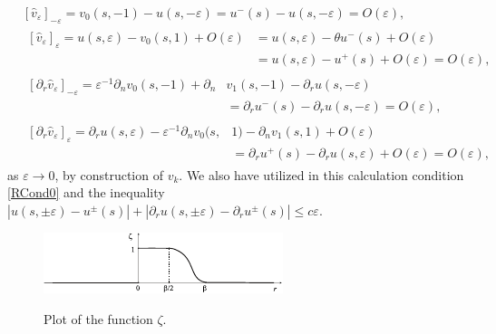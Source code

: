 \documentclass[reqno]{amsart}
\theoremstyle{plain}
\numberwithin{equation}{section}
\newcommand{\eps}{\varepsilon}
\renewcommand{\leq}{\leqslant}
\begin{document}
 \begin{align*}{}
  &[\hat{v}_\eps]_{-\eps}=v_0(s,-1)-u(s,-\eps)
                  =u^-(s)-u(s,-\eps)=O(\eps),
  \\
  &\begin{aligned}{}
  [\hat{v}_\eps]_{\eps}=u(s,\eps)-v_0(s,1)+O(\eps)
                  &=u(s,\eps)-\theta u^-(s)+O(\eps)\\
                  &=u(s,\eps)-u^+(s)+O(\eps)=O(\eps),
   \end{aligned}
   \\
   &\begin{aligned}{}
  [\partial_r\hat{v}_\eps]_{-\eps}=\eps^{-1}\partial_n v_0(s,-1)+\partial_n &v_1(s,-1)-\partial_r u(s,-\eps)
                  \\
  &=\partial_r u^-(s)-\partial_r u(s,-\eps)=O(\eps),
   \end{aligned}
   \\
    &\begin{aligned}{}
  [\partial_r\hat{v}_\eps]_{\eps}=\partial_r u(s,\eps)-\eps^{-1}\partial_n v_0(s,&1)-\partial_nv_1(s,1)+O(\eps)
                  \\
  &=\partial_r u^+(s)-\partial_r u(s,\eps)+O(\eps)=O(\eps),
   \end{aligned}
 \end{align*}
as $\eps\to 0$, by construction of $v_k$. We also have utilized in this calculation condition \eqref{RCond0} and the  inequality
$|u(s,\pm \eps)-u^\pm(s)|+|\partial_ru(s,\pm \eps)
-\partial_r u^\pm(s)|\leq c\eps$.





\begin{figure}[t]
  \centering
  \includegraphics[scale=1.8]{JumpFunction}\\
  \caption{Plot of the function $\zeta$.}\label{FigPlotZeta}
\end{figure}
\end{document}
